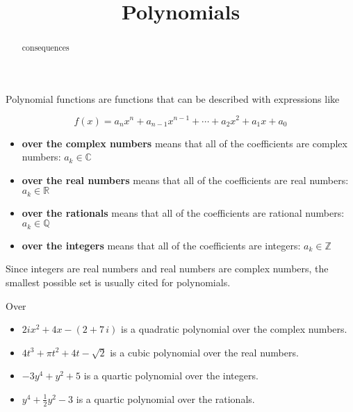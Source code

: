 \documentclass{ximera}
\title{Polynomials}
\begin{document}
\begin{abstract}
consequences
\end{abstract}
\maketitle




Polynomial functions are functions that can be described with expressions like

\[   f(x) = a_n x^n + a_{n-1} x^{n-1} + \cdots + a_2 x^2 + a_1 x + a_0     \]


\begin{itemize}
\item \textbf{over the complex numbers} means that all of the coefficients are complex numbers:   $a_k \in \mathbb{C}$
\item \textbf{over the real numbers} means that all of the coefficients are real numbers:   $a_k \in \mathbb{R}$
\item \textbf{over the rationals} means that all of the coefficients are rational numbers:   $a_k \in \mathbb{Q}$
\item \textbf{over the integers} means that all of the coefficients are integers:   $a_k \in \mathbb{Z}$
\end{itemize}



Since integers are real numbers and real numbers are complex numbers, the smallest possible set is usually cited for polynomials.



\begin{example}  Over


\begin{itemize}
\item $2i x^2 + 4 x - (2 + 7 \,i)$ is a quadratic polynomial over the complex numbers.

\item $4 t^3 + \pi t^2 + 4 t - \sqrt{2}$ is a cubic polynomial over the real numbers.

\item $-3 y^4 +  y^2 + 5$ is a quartic polynomial over the integers.

\item $ y^4 +  \frac{1}{2} y^2 - 3$ is a quartic polynomial over the rationals.
\end{itemize}




\end{example}
\end{document}
